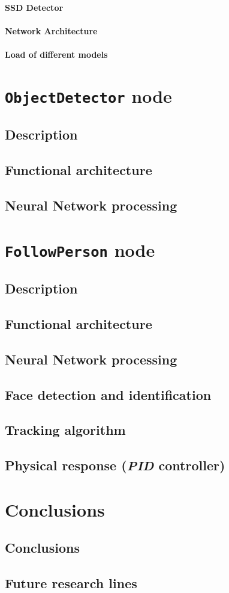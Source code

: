 \subsubsection{SSD Detector}
\subsubsection{Network Architecture}
\subsubsection{Load of different models}


\chapter{\texttt{ObjectDetector} node}
\section{Description}
\section{Functional architecture}
\section{Neural Network processing}


\chapter{\texttt{FollowPerson} node}
\label{chap:followperson}
\section{Description}
\section{Functional architecture}
\section{Neural Network processing}
\section{Face detection and identification}
\section{Tracking algorithm}
\section{Physical response (\emph{PID} controller)}



\chapter{Conclusions}
	\section{Conclusions}
	\section{Future research lines}